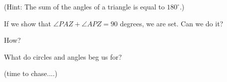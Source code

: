 (Hint: The sum of the angles of a triangle is equal to $180^\circ$.)













If we show that $\angle PAZ + \angle APZ = 90$ degrees, we are set. Can we do it?


How?


What do circles and angles beg us for?

(time to chase....)




